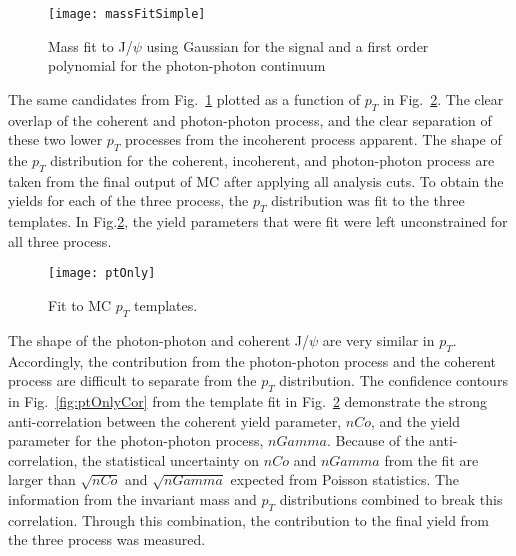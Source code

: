     \begin{figure}[!Hhtb]
      \centering
      \texttt{[image: massFitSimple]}
      \caption{Mass fit to J/$\psi$ using Gaussian for the 
        signal and a first order polynomial for the photon-photon continuum}
      \label{fig:massFit}
    \end{figure}

    The same candidates from Fig.~\ref{fig:massFit} \DIFdelbegin {}\DIFdelend \DIFaddbegin {}\DIFaddend plotted as a function
      of $p_{T}$ in Fig.~\ref{fig:ptTemps}.
    The clear overlap of the coherent and photon-photon process, and the 
      clear separation of these two lower $p_{T}$ processes from the incoherent
      process \DIFdelbegin {}\DIFdelend \DIFaddbegin {}\DIFaddend apparent.
    The shape of the $p_{T}$ distribution for the coherent, incoherent, and 
      photon-photon process are taken from the final output of MC after
      applying all analysis cuts. 
    To obtain the yields for each of the three process, the $p_{T}$ 
      distribution was fit to the three templates.
    In Fig.\ref{fig:ptTemps}, the yield parameters that were fit were left
      unconstrained for all three process.

    \begin{figure}[!Hhbt]
      \centering
      \texttt{[image: ptOnly]}
      \caption{ Fit to MC $p_{T}$ templates. }
      \label{fig:ptTemps}
    \end{figure}

    The shape of the photon-photon \DIFdelbegin {}\DIFdelend and coherent J/$\psi$ \DIFaddbegin {}\DIFaddend are very 
      similar in $p_{T}$.
    Accordingly, the contribution from the photon-photon process and the 
      coherent process are difficult to separate from the $p_{T}$ distribution.
    The confidence contours in Fig.~\ref{fig:ptOnlyCor} from the template fit
      in Fig.~\ref{fig:ptTemps} demonstrate the strong anti-correlation 
      between the coherent yield parameter, $nCo$, and the yield parameter 
      for the photon-photon process, $nGamma$.
    Because of the anti-correlation, the statistical uncertainty on $nCo$ and 
      $nGamma$ from the fit are larger than $\sqrt{nCo}$ and $\sqrt{nGamma}$
      expected from Poisson statistics. 
    The information from the invariant mass and $p_{T}$ distributions \DIFdelbegin {}\DIFdelend \DIFaddbegin {}\DIFaddend combined to break this correlation. 
    Through this combination, the contribution to the final yield from 
      the three process was measured.


